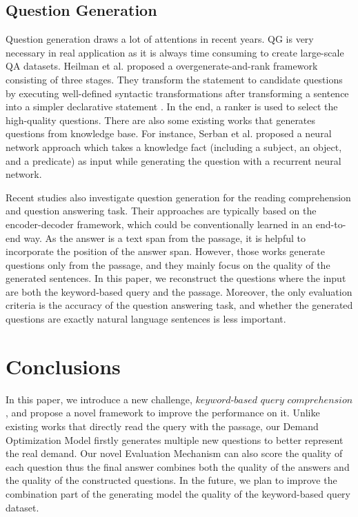 \documentclass[sigconf]{acmart}
\begin{document}
\subsection{Question Generation}
Question generation\cite{Chali2015Towards}\cite{Labutov2015Deep}\cite{Yao2010Question}\cite{Heilman2011Automatic} draws a lot of attentions in recent years. QG is very necessary in real application as it is always time consuming to create large-scale QA datasets. Heilman et al.\cite{Heilman2011Automatic} proposed a overgenerate-and-rank framework consisting of three stages. They transform the statement to candidate questions by executing well-defined syntactic transformations after transforming a sentence into a simpler declarative statement . In the end, a ranker is used to select the high-quality questions. There are also some existing works that generates questions from knowledge base\cite{Song2016Domain}\cite{Serban2016Generating}. For instance, Serban et al.\cite{Serban2016Generating} proposed a neural network approach which takes a knowledge fact (including a subject, an object, and a predicate) as input while generating the question with a recurrent neural network.

Recent studies also investigate question generation for the reading comprehension and question answering task\cite{Zhou2017Neural}\cite{Du2017Learning}\cite{Tang2017Question}. Their approaches are typically based on the encoder-decoder framework, which could be conventionally learned in an end-to-end way. As the answer is a text span from the passage, it is helpful to incorporate the position of the answer span. However, those works generate questions only from the passage, and they mainly focus on the quality of the generated sentences. In this paper, we reconstruct the questions where the input are both the keyword-based query and the passage. Moreover, the only evaluation criteria is the accuracy of the question answering task, and whether the generated questions are exactly natural language sentences is less important.

\section{Conclusions}
In this paper, we introduce a new challenge, $keyword$-$based$ $query$ $comprehension$, and propose a novel framework to improve the performance on it. Unlike existing works that directly read the query with the passage, our Demand Optimization Model firstly generates multiple new questions to better represent the real demand. Our novel Evaluation Mechanism can also score the quality of each question thus the final answer combines both the quality of the answers and the quality of the constructed questions. In the future, we plan to improve the combination part of the generating model the quality of the keyword-based query dataset.
\end{document}
